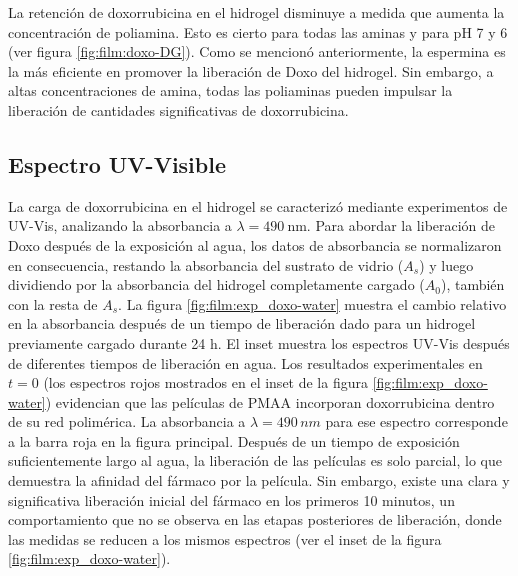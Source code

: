 La retenci\'on de doxorrubicina en el hidrogel disminuye a medida que aumenta la concentraci\'on de poliamina. Esto es cierto para todas las aminas y para pH 7 y 6 (ver figura \ref{fig:film:doxo-DG}). Como se mencion\'o anteriormente, la espermina es la m\'as eficiente en promover la liberaci\'on de Doxo del hidrogel. Sin embargo, a altas concentraciones de amina, todas las poliaminas pueden impulsar la liberaci\'on de cantidades significativas de doxorrubicina.


\subsection{Espectro UV-Visible}

La carga de doxorrubicina en el hidrogel se caracteriz\'o mediante experimentos de UV-Vis, analizando la absorbancia a $\lambda=490\:$nm. Para abordar la liberaci\'on de Doxo despu\'es de la exposici\'on al agua, los datos de absorbancia se normalizaron en consecuencia, restando la absorbancia del sustrato de vidrio ($A_s$) y luego dividiendo por la absorbancia del hidrogel completamente cargado ($A_0$), tambi\'en con la resta de $A_s$. La figura \ref{fig:film:exp_doxo-water} muestra el cambio relativo en la absorbancia despu\'es de un tiempo de liberaci\'on dado para un hidrogel previamente cargado durante 24 h. El inset muestra los espectros UV-Vis despu\'es de diferentes tiempos de liberaci\'on en agua. Los resultados experimentales en $t=0$ (los espectros rojos mostrados en el inset de la figura \ref{fig:film:exp_doxo-water}) evidencian que las pel\'iculas de PMAA incorporan doxorrubicina dentro de su red polim\'erica. La absorbancia a $\lambda=490\, nm$ para ese espectro corresponde a la barra roja en la figura principal. Despu\'es de un tiempo de exposici\'on suficientemente largo al agua, la liberaci\'on de las pel\'iculas es solo parcial, lo que demuestra la afinidad del f\'armaco por la pel\'icula. Sin embargo, existe una clara y significativa liberaci\'on inicial del f\'armaco en los primeros 10 minutos, un comportamiento que no se observa en las etapas posteriores de liberaci\'on, donde las medidas se reducen a los mismos espectros (ver el inset de la figura \ref{fig:film:exp_doxo-water}).


